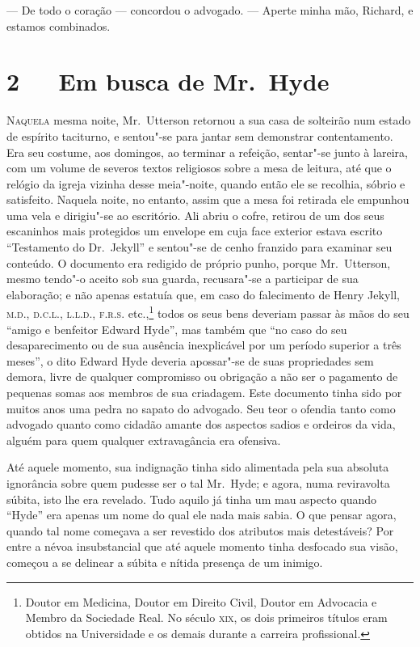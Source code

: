 --- De todo o coração --- concordou o advogado. --- Aperte minha mão,
Richard, e estamos combinados. 


\chapter[2\ \ \ Em busca de Mr.~Hyde]{2\ \ \ Em busca de Mr.~Hyde}

\textsc{Naquela} mesma noite, Mr.~Utterson retornou a sua casa de solteirão num
estado de espírito taciturno, e sentou"-se para jantar sem demonstrar
contentamento.  Era seu costume, aos domingos, ao terminar a refeição,
sentar"-se junto à lareira, com um volume de severos textos religiosos
sobre a mesa de leitura, até que o relógio da igreja vizinha desse
meia"-noite, quando então ele se recolhia, sóbrio e satisfeito.  Naquela
noite, no entanto, assim que a mesa foi retirada ele empunhou uma vela
e dirigiu"-se ao escritório.  Ali abriu o cofre, retirou de um dos seus
escaninhos mais protegidos um envelope em cuja face exterior estava
escrito “Testamento do Dr.~Jekyll” e sentou"-se de cenho franzido para
examinar seu conteúdo.  O documento era redigido de próprio punho,
porque Mr.~Utterson, mesmo tendo"-o aceito sob sua guarda, recusara"-se a
participar de sua elaboração; e não apenas estatuía que, em caso do
falecimento de Henry Jekyll, \textsc{m.d.}, \textsc{d.c.l.}, \textsc{l.l.d.}, \textsc{f.r.s.} etc.,\footnote{
Doutor em Medicina, Doutor em Direito Civil, Doutor em Advocacia e
Membro da Sociedade Real.  No século \textsc{xix}, os dois primeiros títulos eram
obtidos na Universidade e os demais durante a carreira profissional.}
todos os seus bens deveriam passar às mãos do seu
“amigo e benfeitor Edward Hyde”, mas também que “no caso do seu
desaparecimento ou de sua ausência inexplicável por um período superior
a três meses”, o dito Edward Hyde deveria apossar"-se de suas
propriedades sem demora, livre de qualquer compromisso ou obrigação a
não ser o pagamento de pequenas somas aos membros de sua criadagem. 
Este documento tinha sido por muitos anos uma pedra no sapato do
advogado.  Seu teor o ofendia tanto como advogado quanto como cidadão
amante dos aspectos sadios e ordeiros da vida, alguém para quem
qualquer extravagância era ofensiva.

Até aquele momento, sua indignação tinha sido alimentada pela sua
absoluta ignorância sobre quem pudesse ser o tal Mr.~Hyde; e agora,
numa reviravolta súbita, isto lhe era revelado.  Tudo aquilo já tinha
um mau aspecto quando “Hyde” era apenas um nome do qual ele nada mais
sabia.  O que pensar agora, quando tal nome começava a ser revestido
dos atributos mais detestáveis?  Por entre a névoa insubstancial que
até aquele momento tinha desfocado sua visão, começou a se delinear a
súbita e nítida presença de um inimigo. 

